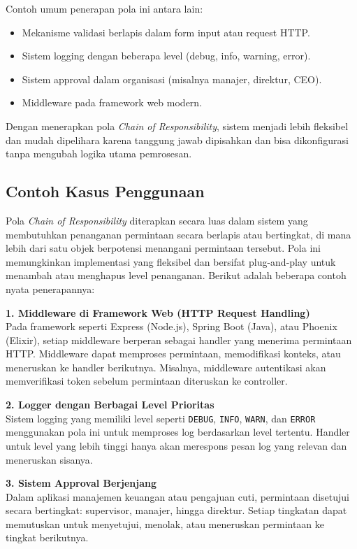 Contoh umum penerapan pola ini antara lain:
\begin{itemize}
	\item Mekanisme validasi berlapis dalam form input atau request HTTP.
	\item Sistem logging dengan beberapa level (debug, info, warning, error).
	\item Sistem approval dalam organisasi (misalnya manajer, direktur, CEO).
	\item Middleware pada framework web modern.
\end{itemize}

Dengan menerapkan pola \textit{Chain of Responsibility}, sistem menjadi lebih fleksibel dan mudah dipelihara karena tanggung jawab dipisahkan dan bisa dikonfigurasi tanpa mengubah logika utama pemrosesan.

\subsection{Contoh Kasus Penggunaan}

Pola \textit{Chain of Responsibility} diterapkan secara luas dalam sistem yang membutuhkan penanganan permintaan secara berlapis atau bertingkat, di mana lebih dari satu objek berpotensi menangani permintaan tersebut. Pola ini memungkinkan implementasi yang fleksibel dan bersifat plug-and-play untuk menambah atau menghapus level penanganan. Berikut adalah beberapa contoh nyata penerapannya:

\textbf{1. Middleware di Framework Web (HTTP Request Handling)} \\
Pada framework seperti Express (Node.js), Spring Boot (Java), atau Phoenix (Elixir), setiap middleware berperan sebagai handler yang menerima permintaan HTTP. Middleware dapat memproses permintaan, memodifikasi konteks, atau meneruskan ke handler berikutnya. Misalnya, middleware autentikasi akan memverifikasi token sebelum permintaan diteruskan ke controller.

\textbf{2. Logger dengan Berbagai Level Prioritas} \\
Sistem logging yang memiliki level seperti \texttt{DEBUG}, \texttt{INFO}, \texttt{WARN}, dan \texttt{ERROR} menggunakan pola ini untuk memproses log berdasarkan level tertentu. Handler untuk level yang lebih tinggi hanya akan merespons pesan log yang relevan dan meneruskan sisanya.

\textbf{3. Sistem Approval Berjenjang} \\
Dalam aplikasi manajemen keuangan atau pengajuan cuti, permintaan disetujui secara bertingkat: supervisor, manajer, hingga direktur. Setiap tingkatan dapat memutuskan untuk menyetujui, menolak, atau meneruskan permintaan ke tingkat berikutnya.

